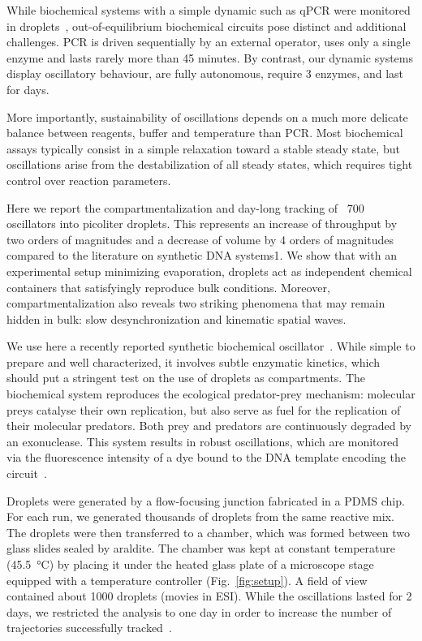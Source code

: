 \documentclass[prl,aps,reprint,
 amsmath,amssymb,superscriptaddress]{revtex4-1}
\begin{document}
 	While biochemical systems with a simple dynamic such as qPCR were monitored in droplets~\cite{Guo2012}, out-of-equilibrium biochemical circuits pose distinct and additional challenges. PCR is driven sequentially by an external operator, uses only a single enzyme and lasts rarely more than 45 minutes. By contrast, our dynamic systems display oscillatory behaviour, are fully autonomous, require 3 enzymes, and last for days.
 	
	More importantly, sustainability of oscillations depends on a much more delicate balance between reagents, buffer and temperature than PCR. Most biochemical assays typically consist in a simple relaxation toward a stable steady state, but oscillations arise from the destabilization of all steady states, which requires tight control over reaction parameters. 
	
	Here we report the compartmentalization and day-long tracking of ~700 oscillators into picoliter droplets. This represents an increase of throughput by two orders of magnitudes and a decrease of volume by 4 orders of magnitudes compared to the literature on synthetic DNA systems1. We show that with an experimental setup minimizing evaporation, droplets act as independent chemical containers that satisfyingly reproduce bulk conditions. Moreover, compartmentalization also reveals two striking phenomena that may remain hidden in bulk: slow desynchronization and kinematic spatial waves. 
	
	We use here a recently reported synthetic biochemical oscillator~\cite{Fujii2013}. While simple to prepare and well characterized, it involves subtle enzymatic kinetics, which should put a stringent test on the use of droplets as compartments. The biochemical system reproduces the ecological predator-prey mechanism: molecular preys catalyse their own replication, but also serve as fuel for the replication of their molecular predators. Both prey and predators are continuously degraded by an exonuclease. This system results in robust oscillations, which are monitored via the fluorescence intensity of a dye bound to the DNA template encoding the circuit~\cite{Padirac2012a}.
	
	Droplets were generated by a flow-focusing junction fabricated in a PDMS chip. For each run, we generated thousands of droplets from the same reactive mix. The droplets were then transferred to a chamber, which was formed between two glass slides sealed by araldite. The chamber was kept at constant temperature (\SI{45.5}{\celsius}) by placing it under the heated glass plate of a microscope stage equipped with a temperature controller (Fig.~\ref{fig:setup}). A field of view contained about 1000 droplets (movies in ESI). While the oscillations lasted for 2 days, we restricted the analysis to one day in order to increase the number of trajectories successfully tracked~\cite{Crocker1996,Besseling2009,Leocmach2013}.
\end{document}
